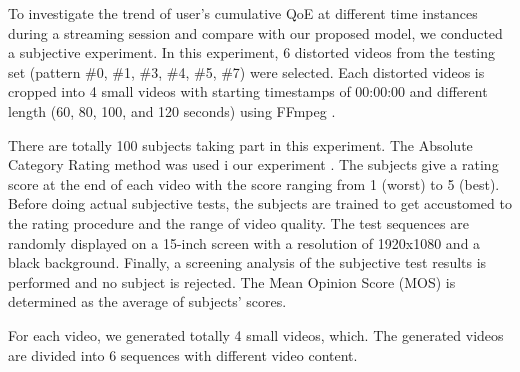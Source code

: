 To investigate the trend of user's cumulative QoE at different time instances during a streaming session and compare with our proposed model, we conducted a subjective experiment. In this experiment, 6 distorted videos from the testing set (pattern \#0, \#1, \#3, \#4, \#5, \#7) were selected. Each distorted videos is cropped into 4 small videos with starting timestamps of 00:00:00 and different length (60, 80, 100, and 120 seconds) using FFmpeg \cite{FFmpeg}.

There are totally 100 subjects taking part in this experiment. The Absolute Category Rating method was used i our experiment \cite{ITUT_P913}. The subjects give a rating score at the end of each video with the score ranging from 1 (worst) to 5 (best). Before doing actual subjective tests, the subjects are trained to get accustomed to the rating procedure and the range of video quality. The test sequences are randomly displayed on a 15-inch screen with a resolution of 1920x1080 and a black background. Finally, a screening analysis of the subjective test results is performed and no subject is rejected. The Mean Opinion Score (MOS) is determined as the average of subjects' scores.

For each video, we generated totally 4 small videos, which. The generated videos are divided into 6 sequences with different video content.